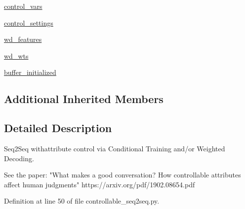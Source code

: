 \begin{DoxyCompactItemize}
\item 
\hyperlink{classprojects_1_1controllable__dialogue_1_1controllable__seq2seq_1_1controllable__seq2seq_1_1ControllableSeq2seqAgent_a60964f1450ffcd6b3ab7696a64e48cd5}{control\+\_\+vars}
\item 
\hyperlink{classprojects_1_1controllable__dialogue_1_1controllable__seq2seq_1_1controllable__seq2seq_1_1ControllableSeq2seqAgent_a10e17fad8f2e68b1610f64dc7d262d1a}{control\+\_\+settings}
\item 
\hyperlink{classprojects_1_1controllable__dialogue_1_1controllable__seq2seq_1_1controllable__seq2seq_1_1ControllableSeq2seqAgent_ae7d42c61a184691bb15d1ea65aee4c72}{wd\+\_\+features}
\item 
\hyperlink{classprojects_1_1controllable__dialogue_1_1controllable__seq2seq_1_1controllable__seq2seq_1_1ControllableSeq2seqAgent_a74800af89333cc27f221ed70dff41e4e}{wd\+\_\+wts}
\item 
\hyperlink{classprojects_1_1controllable__dialogue_1_1controllable__seq2seq_1_1controllable__seq2seq_1_1ControllableSeq2seqAgent_af675df0b6aa0c683d5da13151a82abe4}{buffer\+\_\+initialized}
\end{DoxyCompactItemize}
\subsection*{Additional Inherited Members}


\subsection{Detailed Description}
\begin{DoxyVerb}Seq2Seq withattribute control via Conditional Training and/or Weighted Decoding.

See the paper: "What makes a good conversation? How controllable attributes affect
human judgments" https://arxiv.org/pdf/1902.08654.pdf
\end{DoxyVerb}
 

Definition at line 50 of file controllable\+\_\+seq2seq.\+py.




